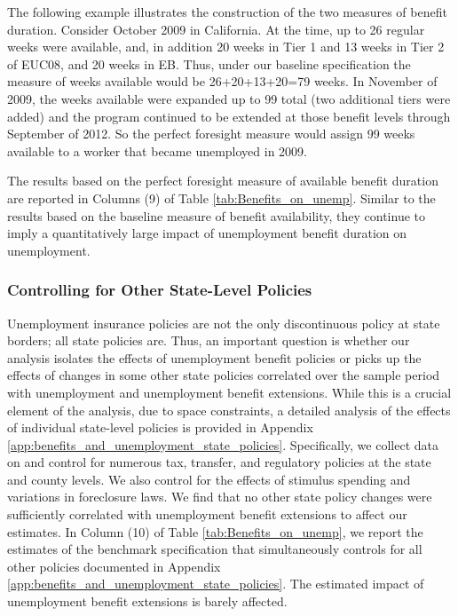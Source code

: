 \documentclass[12pt]{article}
\newcommand{\1}{\mathbf{1}}
\begin{document}
The following example illustrates the construction of the two measures of benefit duration. Consider October 2009 in California. At the time, up to 26 regular weeks were available, and, in addition 20 weeks in Tier 1 and 13 weeks in Tier 2 of EUC08, and 20 weeks in EB.  Thus, under our baseline specification the measure of weeks available would be 26+20+13+20=79 weeks. In November of 2009, the weeks available were expanded up to 99 total (two additional tiers were added) and the program continued to be extended at those benefit levels through September of 2012.  So the perfect foresight measure would assign 99 weeks available to a worker that became unemployed in 2009.

The results based on the perfect foresight measure of available benefit duration are reported in Columns (9) of Table \ref{tab:Benefits_on_unemp}. Similar to the results based on the baseline measure of benefit availability, they continue to imply a quantitatively large impact of unemployment benefit duration on unemployment.


\subsubsection{Controlling for Other State-Level Policies}

Unemployment insurance policies are not the only discontinuous policy at state borders; all state policies are. Thus, an important question is whether our analysis isolates the effects of unemployment benefit policies or picks up the effects of changes in some other state policies correlated over the sample period with unemployment and unemployment benefit extensions. While this is a crucial element of the analysis, due to space constraints, a detailed analysis of the effects of individual state-level policies is provided in Appendix \ref{app:benefits_and_unemployment_state_policies}. Specifically, we collect data on and control for numerous tax, transfer, and regulatory policies at the state and county levels. We also control for the effects of stimulus spending and variations in foreclosure laws. We find that no other state policy changes were sufficiently correlated with unemployment benefit extensions to affect our estimates. In Column (10) of Table \ref{tab:Benefits_on_unemp}, we report the estimates of the benchmark specification that simultaneously controls for all other policies documented in Appendix \ref{app:benefits_and_unemployment_state_policies}. The estimated impact of unemployment benefit extensions is barely affected.
\end{document}
